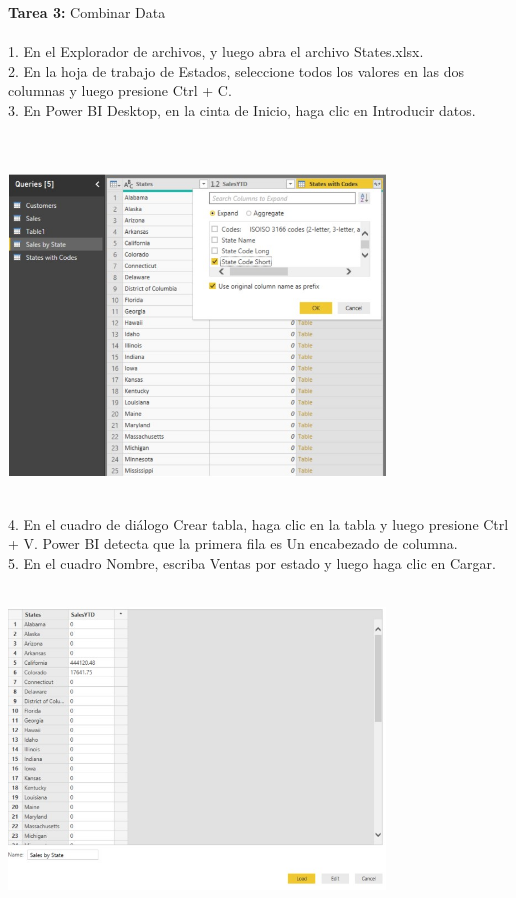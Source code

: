\documentclass[12pt,letterpaper]{article}
\begin{document}
\begin{flushleft}
\begin{itemize}
\textbf{ }\\
\textbf{ }\\
\textbf{ }\\
\textbf{Tarea 3: }Combinar Data  \\
\textbf{ }\\

1. En el Explorador de archivos, y luego abra el archivo States.xlsx.\\
2. En la hoja de trabajo de Estados, seleccione todos los valores en las dos columnas y luego presione Ctrl + C.\\
3. En Power BI Desktop, en la cinta de Inicio, haga clic en Introducir datos.\\


\textbf{ }\\
\textbf{ }\\
\begin{center}
	\includegraphics[width=10cm]{./Imagenes/image26} 
	\end{center}
\textbf{ }\\
4. En el cuadro de diálogo Crear tabla, haga clic en la tabla y luego presione Ctrl + V. Power BI detecta que la primera fila es
Un encabezado de columna.\\
5. En el cuadro Nombre, escriba Ventas por estado y luego haga clic en Cargar.\\

\textbf{ }\\
\begin{center}
	\includegraphics[width=10cm]{./Imagenes/image27} 
	\end{center}
\textbf{ }\\


\end{itemize}
\end{flushleft}
\end{document}

